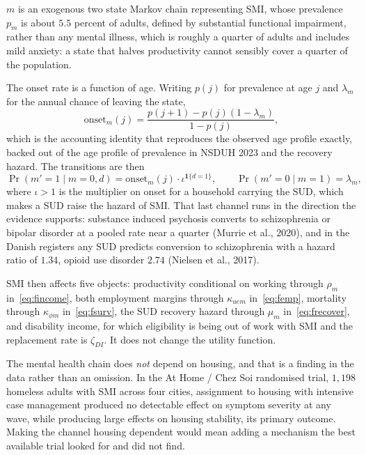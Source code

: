 \documentclass[10pt]{article}
\begin{document}
$m$ is an exogenous two state Markov chain representing SMI, whose
prevalence $p_m$ is about $5.5$ percent of adults, defined by substantial functional
impairment, rather than any mental illness, which is roughly a quarter of adults
and includes mild anxiety: a state that halves productivity cannot sensibly cover
a quarter of the population.

The onset rate is a function of age.
Writing $p(j)$ for prevalence at age $j$ and $\lambda_m$ for the annual chance of
leaving the state,
\begin{equation}\label{eq:fonsetage}
\text{onset}_m(j)=\frac{p(j{+}1)-p(j)(1-\lambda_m)}{1-p(j)},
\end{equation}
which is the accounting identity that reproduces the observed age
profile exactly, backed out of the age profile of prevalence in NSDUH 2023 and the
recovery hazard. The transitions are then
\begin{equation}\label{eq:fonset}
\Pr(m'=1\mid m=0,d)=\text{onset}_m(j)\cdot\iota^{\mathbf{1}\{d=1\}},
\qquad
\Pr(m'=0\mid m=1)=\lambda_m,
\end{equation}
where $\iota>1$ is the multiplier on onset for a household carrying the SUD,
which makes a SUD raise the hazard of SMI. That last channel runs in the
direction the evidence supports: substance induced psychosis converts to
schizophrenia or bipolar disorder at a pooled rate near a quarter
(Murrie et al., 2020), and in the
Danish registers any SUD predicts conversion to schizophrenia
with a hazard ratio of $1.34$, opioid use disorder $2.74$
(Nielsen et al., 2017).

SMI then affects five objects: productivity conditional on working
through $\rho_m$ in~\eqref{eq:fincome}, both employment margins through
$\kappa_{uem}$ in~\eqref{eq:femp}, mortality through $\kappa_{\phi m}$
in~\eqref{eq:fsurv}, the SUD recovery hazard through
$\mu_m$ in~\eqref{eq:frecover}, and
disability income, for which eligibility is being out of work with SMI and
the replacement rate is $\zeta_{DI}$. It does not change the utility function.

The mental health chain does \emph{not} depend on housing, and that is
a finding in the data rather than an omission. In the At Home / Chez Soi randomised trial, $1{,}198$
homeless adults with SMI across four cities, assignment to housing
with intensive case management produced no detectable effect on symptom severity
at any wave, while producing large effects on housing stability, its primary
outcome. Making the channel housing dependent would mean adding a mechanism the
best available trial looked for and did not find.
\end{document}
